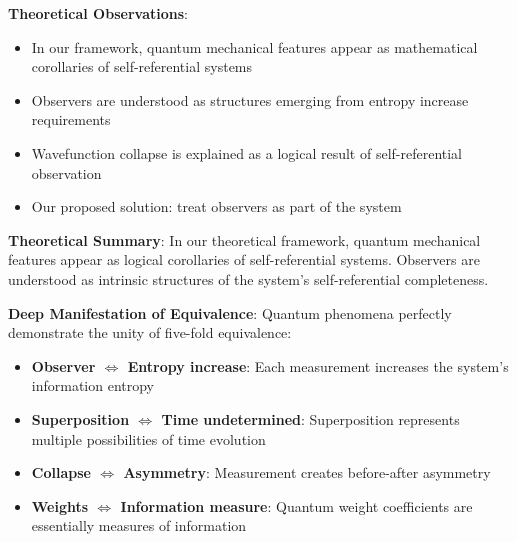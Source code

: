 \textbf{Theoretical Observations}:
\begin{itemize}
\item In our framework, quantum mechanical features appear as mathematical corollaries of self-referential systems
\item Observers are understood as structures emerging from entropy increase requirements
\item Wavefunction collapse is explained as a logical result of self-referential observation
\item Our proposed solution: treat observers as part of the system
\end{itemize}

\textbf{Theoretical Summary}: In our theoretical framework, quantum mechanical features appear as logical corollaries of self-referential systems. Observers are understood as intrinsic structures of the system's self-referential completeness.

\textbf{Deep Manifestation of Equivalence}:
Quantum phenomena perfectly demonstrate the unity of five-fold equivalence:
\begin{itemize}
\item \textbf{Observer $\Leftrightarrow$ Entropy increase}: Each measurement increases the system's information entropy
\item \textbf{Superposition $\Leftrightarrow$ Time undetermined}: Superposition represents multiple possibilities of time evolution
\item \textbf{Collapse $\Leftrightarrow$ Asymmetry}: Measurement creates before-after asymmetry
\item \textbf{Weights $\Leftrightarrow$ Information measure}: Quantum weight coefficients are essentially measures of information
\end{itemize}

